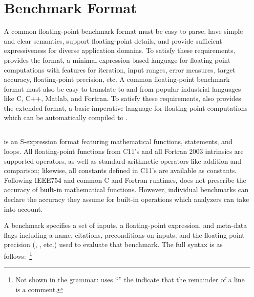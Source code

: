 \documentclass[main.tex]{subfiles}
\begin{document}
\section{Benchmark Format}
\label{sec:format}

A common floating-point benchmark format must be
  easy to parse,
  have simple and clear semantics,
  support floating-point details, and
  provide sufficient expressiveness for diverse application domains.
To satisfy these requirements,
  \name provides the \core format,
  a minimal expression-based language
  for floating-point computations
  with features for iteration, input ranges,
  error measures, target accuracy, floating-point
  precision, etc.
A common floating-point benchmark format
  must also be easy to translate to and from
  popular industrial languages like C, C++, Matlab, and Fortran.
To satisfy these requirements,
  \name also provides the extended \surface format,
  a basic imperative language for floating-point computations
  which can be automatically compiled to \core.

\subsection{\core}

\core is an S-expression format featuring
  mathematical functions,  statements, and  loops.
All floating-point functions
  from C11's  and all Fortran 2003 intrinsics
  are supported operators,
  as well as standard arithmetic operators like addition and comparison;
  likewise, all constants defined in C11's  are available as constants.
Following IEEE754 and common C and Fortran runtimes,
  \core does not prescribe the accuracy of built-in
  mathematical functions.
However, individual benchmarks can declare the accuracy
  they assume for built-in operations which
  analyzers can take into account.


A \core benchmark specifies a set of inputs,
  a floating-point expression,
  and meta-data flags including
  a name, citations, preconditions on inputs,
  and the floating-point precision
  (, , etc.)
  used to evaluate that benchmark.
The full \core syntax is as follows:~\footnote{
Not shown in the grammar:
  \name uses ``\C{;}'' the indicate that
  the remainder of a line is a comment.}
\end{document}
